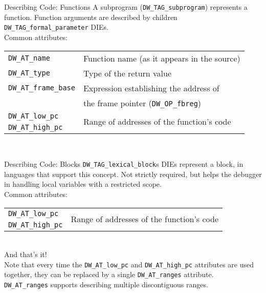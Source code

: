 \begin{frame}{Describing Code: Functions}
A subprogram (\texttt{DW\_TAG\_subprogram}) represents a function. Function arguments are
described by children \texttt{DW\_TAG\_formal\_parameter} DIEs.\\
\medskip
Common attributes:\\
\medskip
\begin{tabular}{ l l }
\texttt{DW\_AT\_name} & Function name (as it appears in the source) \\
\texttt{DW\_AT\_type} & Type of the return value \\
\texttt{DW\_AT\_frame\_base} & Expression establishing the address of \\
& the frame pointer (\texttt{DW\_OP\_fbreg}) \\
\texttt{DW\_AT\_low\_pc} & \multirow{2}{*}{Range of addresses of the function's code} \\
\texttt{DW\_AT\_high\_pc} &  \\
\end{tabular}\\
\end{frame}


\begin{frame}{Describing Code: Blocks}
\texttt{DW\_TAG\_lexical\_block}s DIEs represent a block, in languages that support
this concept. Not strictly required, but helps the debugger in handling local variables
with a restricted scope.\\
\medskip
Common attributes:\\
\medskip
\begin{tabular}{ l l }
\texttt{DW\_AT\_low\_pc} & \multirow{2}{*}{Range of addresses of the function's code} \\
\texttt{DW\_AT\_high\_pc} &  \\
\end{tabular}\\
\smallskip
And that's it!\\
\bigskip
Note that every time the \texttt{DW\_AT\_low\_pc} and \texttt{DW\_AT\_high\_pc} attributes
are used together, they can be replaced by a single \texttt{DW\_AT\_ranges} attribute.\\
\smallskip
\texttt{DW\_AT\_ranges} supports describing multiple discontiguous ranges.
\end{frame}


